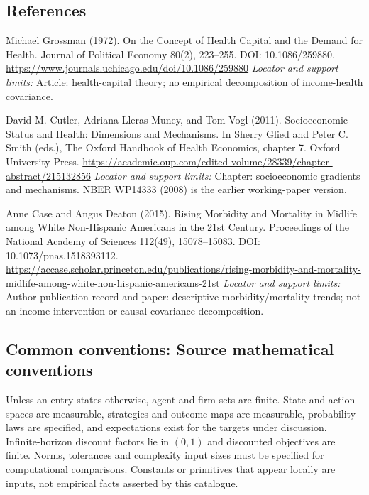 \documentclass[11pt,a4paper]{article}
\begin{document}
\subsection*{References}
\begin{enumerate}[label={[S\arabic*]},leftmargin=*,itemsep=0.6em]
\item Michael Grossman (1972). On the Concept of Health Capital and the Demand for Health. Journal of Political Economy 80(2), 223--255. DOI: 10.1086/259880.
\url{https://www.journals.uchicago.edu/doi/10.1086/259880}
\newline\emph{Locator and support limits:} Article: health-capital theory; no empirical decomposition of income-health covariance.
\item David M. Cutler, Adriana Lleras-Muney, and Tom Vogl (2011). Socioeconomic Status and Health: Dimensions and Mechanisms. In Sherry Glied and Peter C. Smith (eds.), The Oxford Handbook of Health Economics, chapter 7. Oxford University Press.
\url{https://academic.oup.com/edited-volume/28339/chapter-abstract/215132856}
\newline\emph{Locator and support limits:} Chapter: socioeconomic gradients and mechanisms. NBER WP14333 (2008) is the earlier working-paper version.
\item Anne Case and Angus Deaton (2015). Rising Morbidity and Mortality in Midlife among White Non-Hispanic Americans in the 21st Century. Proceedings of the National Academy of Sciences 112(49), 15078--15083. DOI: 10.1073/pnas.1518393112.
\url{https://accase.scholar.princeton.edu/publications/rising-morbidity-and-mortality-midlife-among-white-non-hispanic-americans-21st}
\newline\emph{Locator and support limits:} Author publication record and paper: descriptive morbidity/mortality trends; not an income intervention or causal covariance decomposition.
\end{enumerate}

\subsection*{Common conventions: Source mathematical conventions}

Unless an entry states otherwise, agent and firm sets are finite. State and action spaces are measurable, strategies and outcome maps are measurable, probability laws are specified, and expectations exist for the targets under discussion. Infinite-horizon discount factors lie in $(0,1)$ and discounted objectives are finite. Norms, tolerances and complexity input sizes must be specified for computational comparisons. Constants or primitives that appear locally are inputs, not empirical facts asserted by this catalogue.
\end{document}
